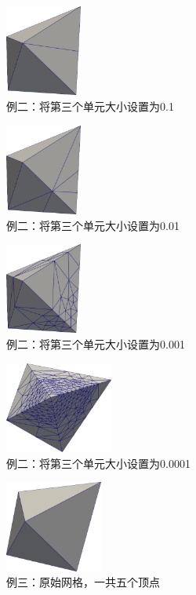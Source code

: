 \begin{figure}[!htbp]
  \centering
  \includegraphics[height=3cm]{fig/2/8.png}
  \caption{例二：将第三个单元大小设置为0.1}
  \label{fig:2-1}
\end{figure}

\begin{figure}[!htbp]
  \centering
  \includegraphics[height=3cm]{fig/2/9.png}
  \caption{例二：将第三个单元大小设置为0.01}
  \label{fig:2-1}
\end{figure}

\begin{figure}[!htbp]
  \centering
  \includegraphics[height=3cm]{fig/2/10.png}
  \caption{例二：将第三个单元大小设置为0.001}
  \label{fig:2-1}
\end{figure}

\begin{figure}[!htbp]
  \centering
  \includegraphics[height=3cm]{fig/2/11.png}
  \caption{例二：将第三个单元大小设置为0.0001}
  \label{fig:2-1}
\end{figure}

\begin{figure}[!htbp]
  \centering
  \includegraphics[height=3cm]{fig/2/12.png}
  \caption{例三：原始网格，一共五个顶点}
  \label{fig:2-1}
\end{figure}

